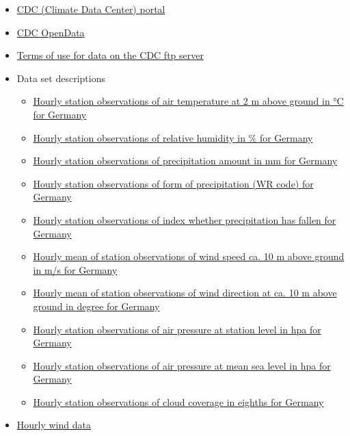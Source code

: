 \begin{itemize}
\tightlist
\item
  \href{https://cdc.dwd.de/portal/}{CDC (Climate Data Center) portal}
\item
  \href{https://opendata.dwd.de/climate_environment/CDC/}{CDC OpenData}
\item
  \href{https://opendata.dwd.de/climate_environment/CDC/Terms_of_use.pdf}{Terms
  of use for data on the CDC ftp server}
\item
  Data set descriptions

  \begin{itemize}
  \tightlist
  \item
    \href{https://cdc.dwd.de/sdi/pid/TT_TU_MN009/DESCRIPTION_TT_TU_MN009_en.pdf}{Hourly
    station observations of air temperature at 2 m above ground in °C
    for Germany}
  \item
    \href{https://cdc.dwd.de/sdi/pid/RF_TU_MN009/DESCRIPTION_RF_TU_MN009_en.pdf}{Hourly
    station observations of relative humidity in \% for Germany}
  \item
    \href{https://cdc.dwd.de/sdi/pid/R1_MN008/DESCRIPTION_R1_MN008_en.pdf}{Hourly
    station observations of precipitation amount in mm for Germany}
  \item
    \href{https://cdc.dwd.de/sdi/pid/WRTR_MN008/DESCRIPTION_WRTR_MN008_en.pdf}{Hourly
    station observations of form of precipitation (WR code) for Germany}
  \item
    \href{https://cdc.dwd.de/sdi/pid/RS_IND_MN008/DESCRIPTION_RS_IND_MN008_en.pdf}{Hourly
    station observations of index whether precipitation has fallen for
    Germany}
  \item
    \href{https://cdc.dwd.de/sdi/pid/F_MN003/DESCRIPTION_F_MN003_en.pdf}{Hourly
    mean of station observations of wind speed ca. 10 m above ground in
    m/s for Germany}
  \item
    \href{https://cdc.dwd.de/sdi/pid/D_MN003/DESCRIPTION_D_MN003_en.pdf}{Hourly
    mean of station observations of wind direction at ca. 10 m above
    ground in degree for Germany}
  \item
    \href{https://cdc.dwd.de/sdi/pid/P0_MN008/DESCRIPTION_P0_MN008_en.pdf}{Hourly
    station observations of air pressure at station level in hpa for
    Germany}
  \item
    \href{https://cdc.dwd.de/sdi/pid/P_MN008/DESCRIPTION_P_MN008_en.pdf}{Hourly
    station observations of air pressure at mean sea level in hpa for
    Germany}
  \item
    \href{https://cdc.dwd.de/sdi/pid/N_MN008/DESCRIPTION_N_MN008_en.pdf}{Hourly
    station observations of cloud coverage in eighths for Germany}
  \end{itemize}
\item
  \href{https://opendata.dwd.de/climate_environment/CDC/observations_germany/climate/hourly/wind/}{Hourly
  wind data}
\end{itemize}

